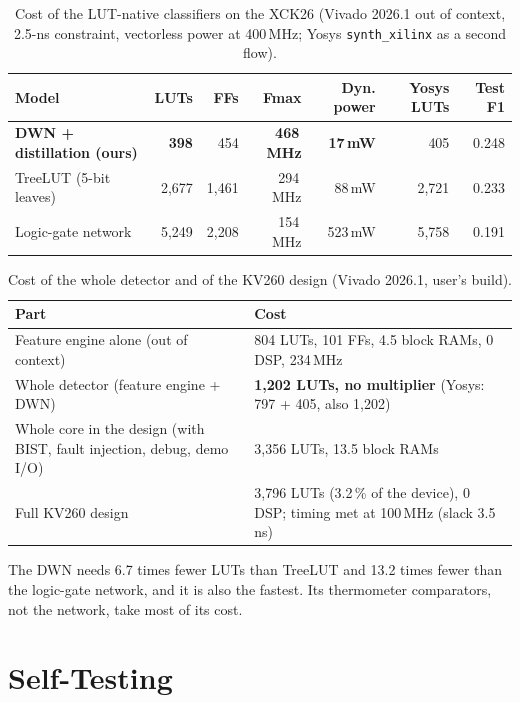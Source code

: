 \begin{table}[H]
\centering\small
\caption{Cost of the LUT-native classifiers on the XCK26 (Vivado 2026.1 out of context, 2.5-ns constraint,
vectorless power at 400\,MHz; Yosys \texttt{synth\_xilinx} as a second flow).}\label{tab:hwcost}
\begin{tabular}{@{}lrrrrrr@{}}
\toprule
\textbf{Model} & \textbf{LUTs} & \textbf{FFs} & \textbf{Fmax} & \textbf{Dyn. power} & \textbf{Yosys LUTs} & \textbf{Test F1}\\
\midrule
\textbf{DWN + distillation (ours)} & \textbf{398} & 454 & \textbf{468\,MHz} & \textbf{17\,mW} & 405 & 0.248\\
TreeLUT (5-bit leaves) & 2,677 & 1,461 & 294\,MHz & 88\,mW & 2,721 & 0.233\\
Logic-gate network & 5,249 & 2,208 & 154\,MHz & 523\,mW & 5,758 & 0.191\\
\bottomrule
\end{tabular}
\end{table}

\begin{table}[H]
\centering\small
\caption{Cost of the whole detector and of the KV260 design (Vivado 2026.1, user's build).}\label{tab:whole}
\begin{tabularx}{\textwidth}{@{}LP{70mm}@{}}
\toprule
\textbf{Part} & \textbf{Cost}\\
\midrule
Feature engine alone (out of context) & 804 LUTs, 101 FFs, 4.5 block RAMs, 0 DSP, 234\,MHz\\
Whole detector (feature engine + DWN) & \textbf{1,202 LUTs, no multiplier} (Yosys: 797 + 405, also 1,202)\\
Whole core in the design (with BIST, fault injection, debug, demo I/O) & 3,356 LUTs, 13.5 block RAMs\\
Full KV260 design & 3,796 LUTs (3.2\,\% of the device), 0 DSP; timing met at 100\,MHz (slack 3.5\,ns)\\
\bottomrule
\end{tabularx}
\end{table}

The DWN needs 6.7 times fewer LUTs than TreeLUT and 13.2 times fewer than the logic-gate network, and it is also the
fastest. Its thermometer comparators, not the network, take most of its cost.

\section{Self-Testing}

